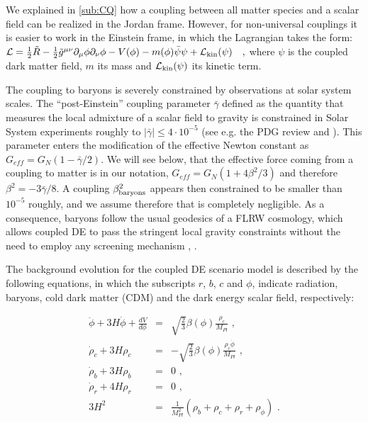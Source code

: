 We explained in \cref{sub:CQ} how a coupling between all matter species and a scalar field can be realized in the Jordan frame.
However, for non-universal couplings it is easier to work in the Einstein frame, in which the Lagrangian takes the form:
\beeqalsp$\label{eq:CDE-Lagrangian}
\mathcal{L} = \frac{1}{2} \tilde R - \frac{1}{2} \tilde{g}^{\mu \nu}  \partial_{\mu}\phi \partial_{\nu}\phi 
- V(\phi) - m(\phi) \bar{\psi} \psi + \mathcal{L}_{\rm kin}(\psi) \quad,
$
where $\psi$ is the coupled dark matter field, $m$ its mass and $\mathcal{L}_{\rm kin}(\psi)$
its kinetic term.

The coupling to baryons is severely constrained by observations at solar system scales.
The ``post-Einstein'' coupling parameter $\bar{\gamma}$ defined as the quantity that
measures the local admixture of a scalar field to gravity is
constrained in Solar System experiments  roughly to
$|\bar{\gamma}|\le4\cdot10^{-5}$ (see e.g. the PDG review \cite{Agashe:2014kda}
and \citep{Will_2005,Bertotti_Iess_Tortora_2003}). 
This parameter enters the modification
of the effective Newton constant as $G_{eff}=G_{N}(1-\bar{\gamma}/2)$. 
We will see below, that the effective force coming from a coupling to matter is
in our notation, $G_{eff}=G_{N}(1+4\beta^{2}/3)$
and therefore $\beta^{2}=-3\bar{\gamma}/8$. A coupling $\beta_{\rm baryons}^{2}$
appears then constrained to be smaller than $10^{-5}$ roughly, and
we assume therefore that is completely negligible. As a consequence,
baryons follow the usual geodesics of a FLRW cosmology, which allows
coupled DE to pass the stringent local gravity constraints without 
the need to employ any screening mechanism \cite{hamilton_atom-interferometry_2015}, 
\cite{khoury2010theories, bloomfield2015shape}.

The background evolution for the coupled DE scenario model is described
by the following equations, in which the subscripts $r$, $b$, $c$
and $\phi$, indicate radiation, baryons, cold dark matter (CDM) and
the dark energy scalar field, respectively:

\begin{eqnarray}
\ddot{\phi}+3H\dot{\phi}+\frac{dV}{d\phi} & = & \sqrt{\frac{2}{3}}\beta(\phi)\frac{\rho_{c}}{M_{Pl}}\,\,,\label{eq:quint-kleingordon}\\
\dot{\rho}_{c}+3H\rho_{c} & = & -\sqrt{\frac{2}{3}}\beta(\phi)\frac{\rho_{c}\dot{\phi}}{M_{Pl}}\,\,,\label{eq:cdm-back-density}\\
\dot{\rho}_{b}+3H\rho_{b} & = & 0\,\,,\\
\dot{\rho}_{r}+4H\rho_{r} & = & 0\,\,,\\
3H^{2} & = & \frac{1}{M_{Pl}^{2}}(\rho_{b}+\rho_{c}+\rho_{r}+\rho_{\phi})\,\,.
\end{eqnarray}


